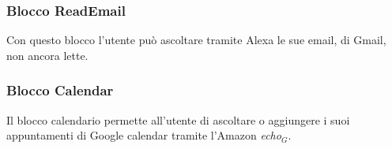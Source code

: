\subsubsection{Blocco ReadEmail}
Con questo blocco l'utente può ascoltare tramite Alexa le sue email, di Gmail, non ancora lette.

\subsubsection{Blocco Calendar}
Il blocco calendario permette all'utente di ascoltare o aggiungere i suoi appuntamenti di Google calendar tramite l'Amazon \textit{echo$_{G}$}.

\newpage
